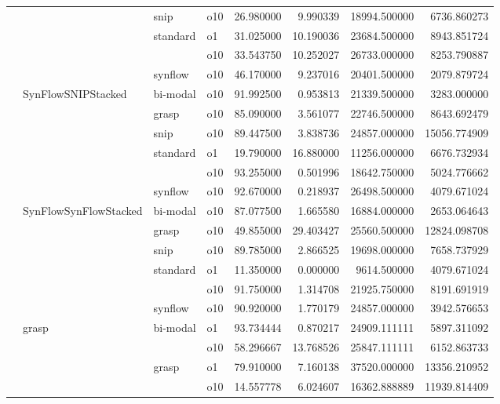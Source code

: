 \begin{longtable}{llllrrrr}
      &     & snip & o10 &  26.980000 &   9.990339 &     18994.500000 &   6736.860273 \\
      &     & standard & o1 &  31.025000 &  10.190036 &     23684.500000 &   8943.851724 \\
      &     &         & o10 &  33.543750 &  10.252027 &     26733.000000 &   8253.790887 \\
      &     & synflow & o10 &  46.170000 &   9.237016 &     20401.500000 &   2079.879724 \\
      & SynFlowSNIPStacked & bi-modal & o10 &  91.992500 &   0.953813 &     21339.500000 &   3283.000000 \\
      &     & grasp & o10 &  85.090000 &   3.561077 &     22746.500000 &   8643.692479 \\
      &     & snip & o10 &  89.447500 &   3.838736 &     24857.000000 &  15056.774909 \\
      &     & standard & o1 &  19.790000 &  16.880000 &     11256.000000 &   6676.732934 \\
      &     &         & o10 &  93.255000 &   0.501996 &     18642.750000 &   5024.776662 \\
      &     & synflow & o10 &  92.670000 &   0.218937 &     26498.500000 &   4079.671024 \\
      & SynFlowSynFlowStacked & bi-modal & o10 &  87.077500 &   1.665580 &     16884.000000 &   2653.064643 \\
      &     & grasp & o10 &  49.855000 &  29.403427 &     25560.500000 &  12824.098708 \\
      &     & snip & o10 &  89.785000 &   2.866525 &     19698.000000 &   7658.737929 \\
      &     & standard & o1 &  11.350000 &   0.000000 &      9614.500000 &   4079.671024 \\
      &     &         & o10 &  91.750000 &   1.314708 &     21925.750000 &   8191.691919 \\
      &     & synflow & o10 &  90.920000 &   1.770179 &     24857.000000 &   3942.576653 \\
      & grasp & bi-modal & o1 &  93.734444 &   0.870217 &     24909.111111 &   5897.311092 \\
      &     &         & o10 &  58.296667 &  13.768526 &     25847.111111 &   6152.863733 \\
      &     & grasp & o1 &  79.910000 &   7.160138 &     37520.000000 &  13356.210952 \\
      &     &         & o10 &  14.557778 &   6.024607 &     16362.888889 &  11939.814409 \\

\end{longtable}
